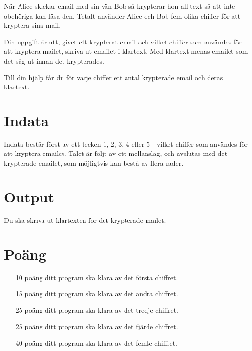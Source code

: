 
När Alice skickar email med sin vän Bob så krypterar hon all text så att inte obehöriga kan läsa den. Totalt använder Alice och Bob fem olika chiffer för att kryptera sina mail.

Din uppgift är att, givet ett krypterat email och vilket chiffer som användes för att kryptera mailet, skriva ut emailet i klartext. Med klartext menas emailet som det såg ut innan det krypterades.

Till din hjälp får du för varje chiffer ett antal krypterade email och deras klartext.

\section*{Indata}
Indata består först av ett tecken 1, 2, 3, 4 eller 5 - vilket chiffer som användes för att kryptera emailet. Talet är följt av ett mellanslag, och avslutas med det krypterade emailet, som möjligtvis kan bestå av flera rader.

\section*{Output}
Du ska skriva ut klartexten för det krypterade mailet.

\section*{Poäng}

\begin{enumerate}
	\item[10 poäng] ditt program ska klara av det första chiffret.
	\item[15 poäng] ditt program ska klara av det andra chiffret.
	\item[25 poäng] ditt program ska klara av det tredje chiffret.
	\item[25 poäng] ditt program ska klara av det fjärde chiffret.
	\item[40 poäng] ditt program ska klara av det femte chiffret.
\end{enumerate}
